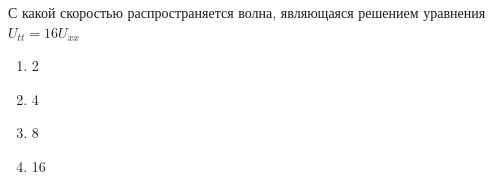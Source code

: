 С какой скоростью распространяется волна, являющаяся решением уравнения \(U_{tt}=16U_{xx}\)

\begin{enumerate}[label=\arabic*)]
    \item 2
    \item 4
    \item 8
    \item 16
\end{enumerate}

